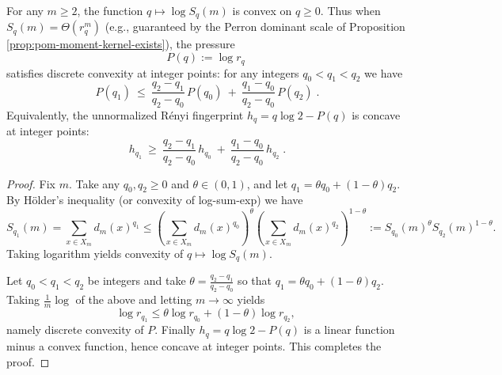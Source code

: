 \begin{proposition}\label{prop:pom-pressure-convexity}
For any \(m\ge 2\), the function \(q\mapsto \log S_q(m)\) is convex on \(q\ge 0\).
Thus when \(S_q(m)=\Theta(r_q^m)\) (e.g., guaranteed by the Perron dominant scale of Proposition \ref{prop:pom-moment-kernel-exists}), the pressure
\[
P(q):=\log r_q
\]
satisfies discrete convexity at integer points: for any integers \(q_0<q_1<q_2\) we have
\[
\boxed{\;
P(q_1)\ \le\ \frac{q_2-q_1}{q_2-q_0}\,P(q_0)\ +\ \frac{q_1-q_0}{q_2-q_0}\,P(q_2)\; }.
\]
Equivalently, the unnormalized Rényi fingerprint \(h_q=q\log 2-P(q)\) is concave at integer points:
\[
\boxed{\;
h_{q_1}\ \ge\ \frac{q_2-q_1}{q_2-q_0}\,h_{q_0}\ +\ \frac{q_1-q_0}{q_2-q_0}\,h_{q_2}\; }.
\]
\end{proposition}
\begin{proof}
Fix \(m\). Take any \(q_0,q_2\ge 0\) and \(\theta\in(0,1)\), and let \(q_1=\theta q_0+(1-\theta)q_2\).
By Hölder's inequality (or convexity of log-sum-exp) we have
\[
S_{q_1}(m)=\sum_{x\in X_m}d_m(x)^{q_1}
\le
\left(\sum_{x\in X_m}d_m(x)^{q_0}\right)^{\theta}
\left(\sum_{x\in X_m}d_m(x)^{q_2}\right)^{1-\theta}
:=S_{q_0}(m)^{\theta}S_{q_2}(m)^{1-\theta}.
\]
Taking logarithm yields convexity of \(q\mapsto \log S_q(m)\).
\par
Let \(q_0<q_1<q_2\) be integers and take
\(
\theta=\frac{q_2-q_1}{q_2-q_0}
\)
so that \(q_1=\theta q_0+(1-\theta)q_2\).
Taking \(\frac{1}{m}\log\) of the above and letting \(m\to\infty\) yields
\[
\log r_{q_1}\le \theta\log r_{q_0}+(1-\theta)\log r_{q_2},
\]
namely discrete convexity of \(P\). Finally \(h_q=q\log 2-P(q)\) is a linear function minus a convex function, hence concave at integer points. This completes the proof.
\end{proof}

